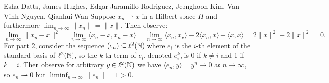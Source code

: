 

\begin{solution}{Esha Datta, James Hughes, Edgar Jaramillo Rodriguez, Jeonghoon Kim, Van Vinh Nguyen, Qianhui Wan}
        Suppose $x_n \rightharpoonup x$ in a Hilbert space $H$ and furthermore $\lim_{n\to\infty}\lVert x_n \rVert = \lVert x \rVert$.
        Then observe:
        \[ \lim_{n\to\infty}\lVert x_n-x \rVert^2 = \lim_{n\to\infty} \langle x_n-x,x_n-x\rangle = \lim_{n\to\infty}\langle x_n,x_n\rangle -2\langle x_n,x\rangle + \langle x,x\rangle = 2\lVert x \rVert^2-2\lVert x \rVert^2 = 0. \]
        For part 2, consider the sequence $(e_n) \subseteq \ell^2(\mathbb{N})$ where $e_i$ is the $i$-th element of the standard basis of $\ell^2(\mathbb{N})$, so the $k$-th term of $e_i$, denoted $e_i^k$, is 0 if $k\neq i$ and 1 if $k=i$.
        Then observe for arbitrary $y\in \ell^2(\mathbb{N})$ we have $\langle e_n, y\rangle = y^n \to 0$ as $n\to \infty$, so $e_n\rightharpoonup 0$ but $\liminf_{n\to\infty} \lVert e_n \rVert = 1 > 0$.
\end{solution}

